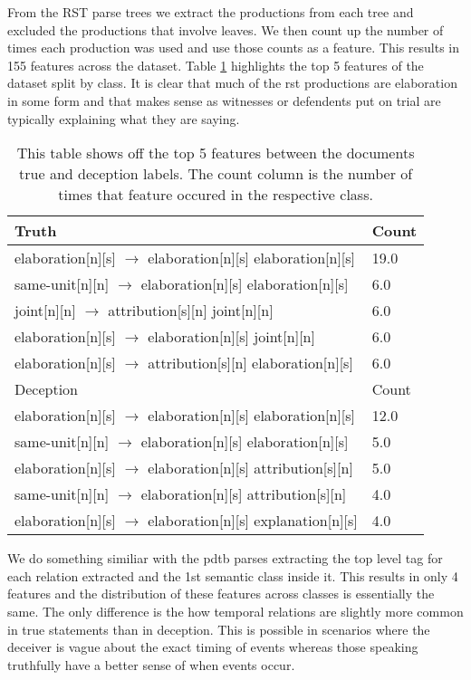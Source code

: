 \documentclass[12pt]{article}
\begin{document}
From the RST parse trees we extract the productions from each tree and excluded
the productions that involve leaves. We then count up the number of times each
production was used and use those counts as a feature. This results in 155
features across the dataset. Table \ref{rst} highlights the top 5 features of
the dataset split by class. It is clear that much of the rst productions are
elaboration in some form and that makes sense as witnesses or defendents put on
trial are typically explaining what they are saying. 
\begin{table}[H]
  \centering
  \begin{tabular}{|l|l|}
    \hline
    Truth & Count \\  \hline
    elaboration[n][s] $\rightarrow$ elaboration[n][s] elaboration[n][s]& 19.0 \\  
    same-unit[n][n] $\rightarrow$ elaboration[n][s] elaboration[n][s]& 6.0 \\    
    joint[n][n] $\rightarrow$ attribution[s][n] joint[n][n]& 6.0 \\              
    elaboration[n][s] $\rightarrow$ elaboration[n][s] joint[n][n]& 6.0 \\
    elaboration[n][s] $\rightarrow$ attribution[s][n] elaboration[n][s]& 6.0 \\ \hline
    Deception & Count \\ \hline
    elaboration[n][s] $\rightarrow$ elaboration[n][s] elaboration[n][s]& 12.0 \\
    same-unit[n][n] $\rightarrow$ elaboration[n][s] elaboration[n][s]& 5.0 \\
    elaboration[n][s] $\rightarrow$ elaboration[n][s] attribution[s][n]& 5.0 \\
    same-unit[n][n] $\rightarrow$ elaboration[n][s] attribution[s][n]& 4.0 \\
    elaboration[n][s] $\rightarrow$ elaboration[n][s] explanation[n][s]& 4.0\\ \hline
  \end{tabular}
  \caption{This table shows off the top 5 features between the documents true
    and deception labels. The count column is the number of times that feature
    occured in the respective class.}
  \label{rst}
\end{table}

We do something similiar with the pdtb parses extracting the top level tag
for each relation extracted and the 1st semantic class inside it. This results
in only 4 features and the distribution of these features across classes is
essentially the same. The only difference is the how temporal relations are
slightly more common in true statements than in deception. This is possible in
scenarios where the deceiver is vague about the exact timing of events whereas
those speaking truthfully have a better sense of when events occur.
\end{document}
